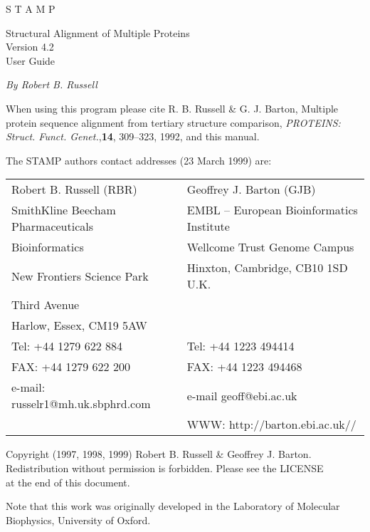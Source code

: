 \begin{titlepage}
\begin{center}
\begin{bf}
\begin{Huge}
S T A M P\\
\end{Huge}
\begin{Large}
Structural Alignment of Multiple Proteins \\
Version 4.2\\
User Guide\\
\end{Large}
\end{bf}
\vskip 0.25in

{\em By Robert B. Russell}\\
\end{center}
\vskip 0.25in

\noindent
When using this program please cite R. B. Russell \& G. J.  Barton, 
Multiple protein sequence alignment from tertiary structure 
comparison, {\em PROTEINS: Struct. Funct. Genet.},{\bf 14}, 
309--323, 1992, and this manual.\\

\vskip 0.25in

The STAMP authors contact addresses (23 March 1999) are:

\vskip 0.1in

\begin{tabular}{ll}
Robert B. Russell (RBR)		   & Geoffrey J. Barton (GJB)\\
SmithKline Beecham Pharmaceuticals & EMBL -- European Bioinformatics Institute\\
Bioinformatics                     & Wellcome Trust Genome Campus\\
New Frontiers Science Park         & Hinxton, Cambridge, CB10 1SD U.K.\\
Third Avenue                       & \\
Harlow, Essex, CM19 5AW            & \\
Tel: +44 1279 622 884              & Tel: +44 1223 494414\\
FAX: +44 1279 622 200              & FAX: +44 1223 494468\\
e-mail: russelr1@mh.uk.sbphrd.com  & e-mail geoff@ebi.ac.uk\\
                                   & WWW: http://barton.ebi.ac.uk// \\
\end{tabular}
\vskip 0.25in
\noindent
\begin{center}
Copyright (1997, 1998, 1999) Robert B. Russell \& Geoffrey J. Barton.\\
Redistribution without permission is forbidden.  Please see the LICENSE\\
at the end of this document.

\vskip 0.1in

Note that this work was originally developed in the Laboratory of Molecular
Biophysics, University of Oxford.
\noindent

\end{center}

\end{titlepage}

